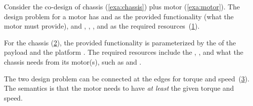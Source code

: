 



\begin{example}
    \label{exa:chassis_plus_motor}Consider the co-design of chassis (\cref{exa:chassis})
    plus motor (\cref{exa:motor}). The design problem for a motor has 
    and  as the provided functionality (what the motor must
    provide), and , , , and 
    as the required resources~(\cref{fig:motor}).

    \begin{figure}[h]
        \centering
        \caption{\label{fig:motor}}
    \end{figure}


    \noindent For the chassis (\cref{fig:gmcdp_chassis}), the provided
    functionality is parameterized by the  of the payload and
    the platform . The required resources include the ,
    , and what the chassis needs from its motor(s), such
    as  and .

    \begin{figure}[h]
        \centering
        \caption{\label{fig:gmcdp_chassis}}
    \end{figure}


    \noindent The two design problem can be connected at the edges for
    torque and speed~(\cref{fig:gmcdp_chassis_plus_motor_series}). The
    semantics is that the motor needs to have\emph{ at least }the given
    torque and speed.


    \begin{figure}[h!]
        \centering
        \caption{\label{fig:gmcdp_chassis_plus_motor_series}}
    \end{figure}


\end{example}
